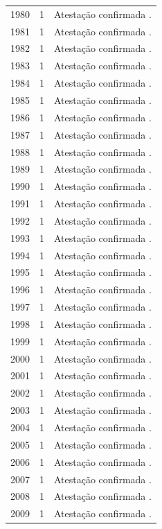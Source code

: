\begin{longtable}{rrp{}}
1980 & 1 & Atestação confirmada \cite{anual1980}. \\
1981 & 1 & Atestação confirmada \cite{anual1981}. \\
1982 & 1 & Atestação confirmada \cite{anual1982}. \\
1983 & 1 & Atestação confirmada \cite{anual1983}. \\
1984 & 1 & Atestação confirmada \cite{anual1984}. \\
1985 & 1 & Atestação confirmada \cite{camara1985}. \\
1986 & 1 & Atestação confirmada \cite{anual1986}. \\
1987 & 1 & Atestação confirmada \cite{anual1987}. \\
1988 & 1 & Atestação confirmada \cite{anual1988}. \\
1989 & 1 & Atestação confirmada \cite{anual1989}. \\
1990 & 1 & Atestação confirmada \cite{anual1990}. \\
1991 & 1 & Atestação confirmada \cite{anual1991}. \\
1992 & 1 & Atestação confirmada \cite{anual1992}. \\
1993 & 1 & Atestação confirmada \cite{anual1993}. \\
1994 & 1 & Atestação confirmada \cite{folha1994}. \\
1995 & 1 & Atestação confirmada \cite{anual1995}. \\
1996 & 1 & Atestação confirmada \cite{anual1996}. \\
1997 & 1 & Atestação confirmada \cite{anual1997}. \\
1998 & 1 & Atestação confirmada \cite{anual1998}. \\
1999 & 1 & Atestação confirmada \cite{anual1999}. \\
2000 & 1 & Atestação confirmada \cite{anual2000}. \\
2001 & 1 & Atestação confirmada \cite{anual2001}. \\
2002 & 1 & Atestação confirmada \cite{anual2002}. \\
2003 & 1 & Atestação confirmada \cite{anual2003}. \\
2004 & 1 & Atestação confirmada \cite{anual2004}. \\
2005 & 1 & Atestação confirmada \cite{anual2005}. \\
2006 & 1 & Atestação confirmada \cite{anual2006}. \\
2007 & 1 & Atestação confirmada \cite{young2008}. \\
2008 & 1 & Atestação confirmada \cite{anual2008}. \\
2009 & 1 & Atestação confirmada \cite{anual2009}. \\
\bottomrule\end{longtable}\normalsize